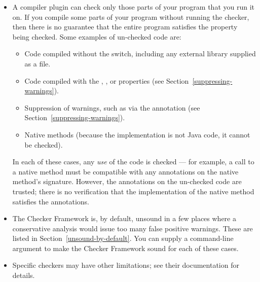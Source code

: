 \begin{itemize}

\item
  A compiler plugin can check only those parts of your program that you run
  it on.  If you compile some parts of your program without running the
  checker, then there is no guarantee that the entire program satisfies the
  property being checked.  Some examples of un-checked code are:

  \begin{itemize}
  \item
    Code compiled without the  switch, including any
    external library supplied as a  file.
  \item
    Code compiled with the , ,  or 
    properties (see Section~\ref{suppressing-warnings}).
  \item
    Suppression of warnings, such as via the 
    annotation (see Section~\ref{suppressing-warnings}).
  \item
    Native methods (because the implementation is not Java code, it cannot
    be checked).
  \end{itemize}

  In each of these cases, any \emph{use} of the code is checked --- for
  example, a call to a native method must be compatible with any
  annotations on the native method's signature.
  However, the annotations on the un-checked code are trusted; there is no
  verification that the implementation of the native method satisfies the
  annotations.

\item
  The Checker Framework is, by default, unsound in a few places where a
  conservative analysis would issue too many false positive warnings.
  These are listed in Section~\ref{unsound-by-default}.
  You can supply a command-line argument to make the Checker Framework
  sound for each of these cases.


\item
  Specific checkers may have other limitations; see their documentation for
  details.

\end{itemize}

